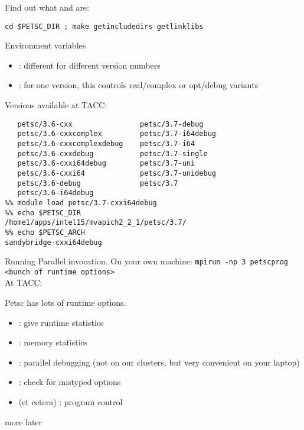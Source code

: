 \begin{numberedframe}
Find out what  and  are:
\begin{verbatim}
cd $PETSC_DIR ; make getincludedirs getlinklibs
\end{verbatim}
\end{numberedframe}

\begin{numberedframe}{Environment variables}
\small
  \begin{itemize}
  \item {} : different for different version numbers
  \item {} : for one version, this controls real/complex
    or opt/debug variants
  \end{itemize}
Versions available at TACC: 
\begin{verbatim}
   petsc/3.6-cxx                petsc/3.7-debug
   petsc/3.6-cxxcomplex         petsc/3.7-i64debug
   petsc/3.6-cxxcomplexdebug    petsc/3.7-i64
   petsc/3.6-cxxdebug           petsc/3.7-single
   petsc/3.6-cxxi64debug        petsc/3.7-uni
   petsc/3.6-cxxi64             petsc/3.7-unidebug
   petsc/3.6-debug              petsc/3.7
   petsc/3.6-i64debug
%% module load petsc/3.7-cxxi64debug
%% echo $PETSC_DIR
/home1/apps/intel15/mvapich2_2_1/petsc/3.7/
%% echo $PETSC_ARCH
sandybridge-cxxi64debug
\end{verbatim}
\end{numberedframe}

\begin{numberedframe}{Running}
Parallel invocation. On your own machine:
\verb+mpirun -np 3 petscprog <bunch of runtime options>+\\
At TACC: 

Petsc has lots of runtime options.
\begin{itemize}
\item {} : give runtime statistics
\item {}  : memory statistics
\item {} : parallel debugging (not on our
  clusters, but very convenient on your laptop)
\item {} : check for mistyped options
\item {} (et cetera) : program control
\end{itemize}
more later
\end{numberedframe}


